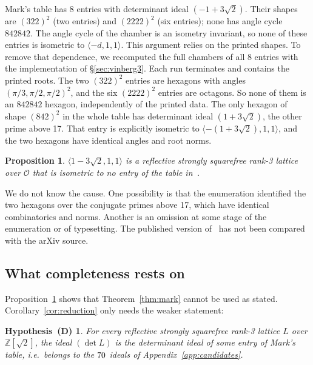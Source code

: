 \documentclass[11pt]{amsart}
\newtheorem{proposition}[theorem]{Proposition}
\newtheorem*{hypothesis}{Hypothesis~(D)}
\theoremstyle{definition}
\newcommand{\Z}{\mathbb{Z}}
\newcommand{\OK}{\mathcal{O}}
\begin{document}
Mark's table has 8 entries with determinant ideal $(-1+3\sqrt2)$. Their shapes are $(322)^2$
(two entries) and $(2222)^2$ (six entries); none has angle cycle $842842$. The angle cycle of
the chamber is an isometry invariant, so none of these entries is isometric to
$\langle-d,1,1\rangle$. This argument relies on the printed shapes. To remove that dependence, we recomputed the
full chambers of all 8 entries with the implementation of \S\ref{sec:vinberg3}. Each run
terminates and contains the printed roots. The two $(322)^2$ entries are hexagons with
angles $(\pi/3,\pi/2,\pi/2)^2$, and the six $(2222)^2$ entries are octagons. So none of them
is an $842842$ hexagon, independently of the printed data. The only hexagon of shape $(842)^2$ in the whole table has
determinant ideal $(1+3\sqrt2)$, the other prime above 17. That entry is explicitly isometric
to $\langle-(1+3\sqrt2),1,1\rangle$, and the two hexagons have identical angles and root
norms.

\begin{proposition}\label{prop:gap}
$\langle1-3\sqrt2,1,1\rangle$ is a reflective strongly squarefree rank-3 lattice over $\OK$
that is isometric to no entry of the table in~\cite{Mar18}.
\end{proposition}

We do not know the cause. One possibility is that the enumeration identified the two
hexagons over the conjugate primes above 17, which have identical combinatorics and norms.
Another is an omission at some stage of the enumeration or of typesetting. The published
version of~\cite{Mar18} has not been compared with the arXiv source.

\subsection{What completeness rests on}
Proposition~\ref{prop:gap} shows that Theorem~\ref{thm:mark} cannot be used as stated.
Corollary~\ref{cor:reduction} only needs the weaker statement:

\begin{hypothesis}
For every reflective strongly squarefree rank-3 lattice $L$ over $\Z[\sqrt2]$, the ideal
$(\det L)$ is the determinant ideal of some entry of Mark's table, i.e.\ belongs to the
$70$ ideals of Appendix~\ref{app:candidates}.
\end{hypothesis}
\end{document}
